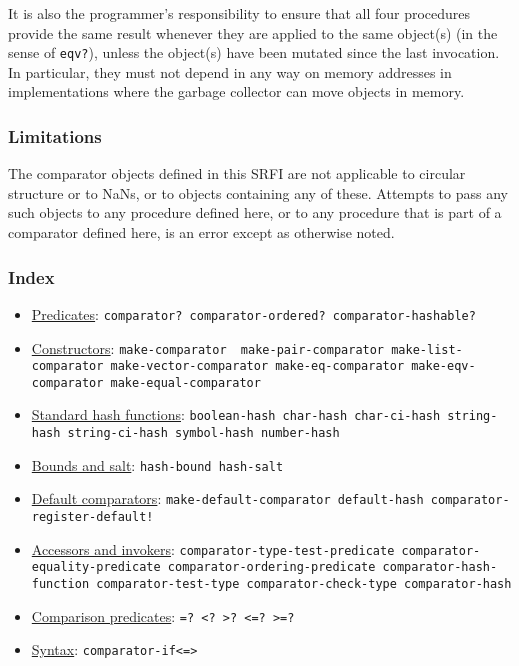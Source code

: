 It is also the programmer's responsibility to ensure that all four
procedures provide the same result whenever they are applied to the same
object(s) (in the sense of \texttt{eqv?}), unless the object(s) have
been mutated since the last invocation. In particular, they must not
depend in any way on memory addresses in implementations where the
garbage collector can move objects in memory.

\subsubsection{Limitations}\label{limitations}

The comparator objects defined in this SRFI are not applicable to
circular structure or to NaNs, or to objects containing any of these.
Attempts to pass any such objects to any procedure defined here, or to
any procedure that is part of a comparator defined here, is an error
except as otherwise noted.

\subsubsection{Index}\label{index}

\begin{itemize}
\item
  \protect\hyperlink{Predicates}{Predicates}:
  \texttt{comparator?\ comparator-ordered?\ comparator-hashable?}
\item
  \protect\hyperlink{Constructors}{Constructors}:
  \texttt{make-comparator\ \ make-pair-comparator\ make-list-comparator\ make-vector-comparator\ make-eq-comparator\ make-eqv-comparator\ make-equal-comparator}
\item
  \protect\hyperlink{Hashfunctions}{Standard hash functions}:
  \texttt{boolean-hash\ char-hash\ char-ci-hash\ string-hash\ string-ci-hash\ symbol-hash\ number-hash}
\item
  \protect\hyperlink{Boundsandsalt}{Bounds and salt}:
  \texttt{hash-bound\ hash-salt}
\item
  \protect\hyperlink{Defaultcomparators}{Default comparators}:
  \texttt{make-default-comparator\ default-hash\ comparator-register-default!}
\item
  \protect\hyperlink{Accessorsandinvokers}{Accessors and invokers}:
  \texttt{comparator-type-test-predicate\ comparator-equality-predicate\ comparator-ordering-predicate\ comparator-hash-function\ comparator-test-type\ comparator-check-type\ comparator-hash}
\item
  \protect\hyperlink{Comparisonpredicates}{Comparison predicates}:
  \texttt{=?\ \textless{}?\ \textgreater{}?\ \textless{}=?\ \textgreater{}=?}
\item
  \protect\hyperlink{Syntax}{Syntax}:
  \texttt{comparator-if\textless{}=\textgreater{}}
\end{itemize}

